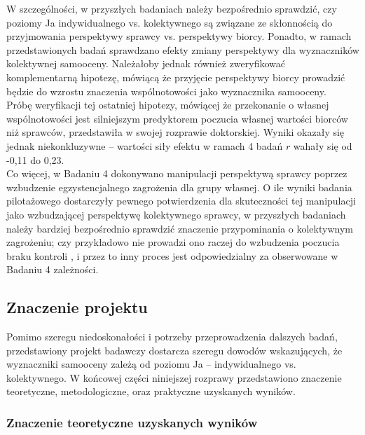 \documentclass[man]{apa6}
\begin{document}
W szczególności, w przyszłych badaniach należy bezpośrednio sprawdzić, czy poziomy Ja indywidualnego vs. kolektywnego są związane ze skłonnością do przyjmowania perspektywy sprawcy vs. perspektywy biorcy. Ponadto, w ramach przedstawionych badań sprawdzano efekty zmiany perspektywy dla wyznaczników kolektywnej samooceny. Należałoby jednak również zweryfikować komplementarną hipotezę, mówiącą że przyjęcie perspektywy biorcy prowadzić będzie do wzrostu znaczenia wspólnotowości jako wyznacznika samooceny.\\

Próbę weryfikacji tej ostatniej hipotezy, mówiącej że przekonanie o własnej wspólnotowości jest silniejszym predyktorem poczucia własnej wartości biorców niż sprawców, przedstawiła \textcite{bialobrzeska2015perspektywy} w swojej rozprawie doktorskiej. Wyniki okazały się jednak niekonkluzywne -- wartości siły efektu w ramach 4 badań $r$ wahały się od -0,11 do 0,23. \\

Co więcej, w Badaniu 4 dokonywano manipulacji perspektywą sprawcy poprzez wzbudzenie egzystencjalnego zagrożenia dla grupy własnej. O ile wyniki badania pilotażowego dostarczyły pewnego potwierdzenia dla skuteczności tej manipulacji jako wzbudzającej perspektywę kolektywnego sprawcy, w przyszłych badaniach należy bardziej bezpośrednio sprawdzić znaczenie przypominania o kolektywnym zagrożeniu; czy przykładowo nie prowadzi ono raczej do wzbudzenia poczucia braku kontroli \parencite[patrz, ][]{sullivan2010existential}, i przez to inny proces jest odpowiedzialny za obserwowane w Badaniu 4 zależności. \\

\subsection{Znaczenie projektu}

Pomimo szeregu niedoskonałości i potrzeby przeprowadzenia dalszych badań, przedstawiony projekt badawczy dostarcza szeregu dowodów wskazujących, że wyznaczniki samooceny zależą od poziomu Ja -- indywidualnego vs. kolektywnego. W końcowej części niniejszej rozprawy przedstawiono znaczenie teoretyczne, metodologiczne, oraz praktyczne uzyskanych wyników.\\

\subsubsection{Znaczenie teoretyczne uzyskanych wyników}
\end{document}
